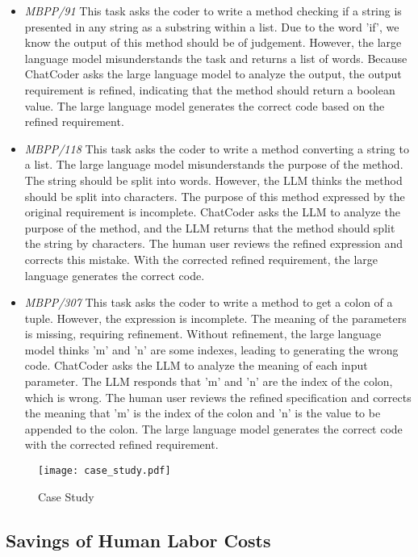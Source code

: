 \documentclass[sigconf]{acmart}
\begin{document}
\begin{itemize}
    \item \textit{MBPP/91} This task asks the coder to write a method checking if a string is presented in any string as a substring within a list. Due to the word 'if', we know the output of this method should be of judgement. However, the large language model misunderstands the task and returns a list of words. Because ChatCoder asks the large language model to analyze the output, the output requirement is refined, indicating that the method should return a boolean value. The large language model generates the correct code based on the refined requirement.
    \item \textit{MBPP/118} This task asks the coder to write a method converting a string to a list. The large language model misunderstands the purpose of the method. The string should be split into words. However, the LLM thinks the method should be split into characters. The purpose of this method expressed by the original requirement is incomplete. ChatCoder asks the LLM to analyze the purpose of the method, and the LLM returns that the method should split the string by characters. The human user reviews the refined expression and corrects this mistake. With the corrected refined requirement, the large language generates the correct code.
    \item \textit{MBPP/307} This task asks the coder to write a method to get a colon of a tuple. However, the expression is incomplete. The meaning of the parameters is missing, requiring refinement. Without refinement, the large language model thinks 'm' and 'n' are some indexes, leading to generating the wrong code. ChatCoder asks the LLM to analyze the meaning of each input parameter. The LLM responds that 'm' and 'n' are the index of the colon, which is wrong. The human user reviews the refined specification and corrects the meaning that 'm' is the index of the colon and 'n' is the value to be appended to the colon. The large language model generates the correct code with the corrected refined requirement.
\end{itemize}
\begin{figure*}[htbp]
    \centering
    \texttt{[image: case\_study.pdf]}
    \caption{Case Study}
    \label{fig:cases}
\end{figure*}
\subsection{Savings of Human Labor Costs}
\end{document}
